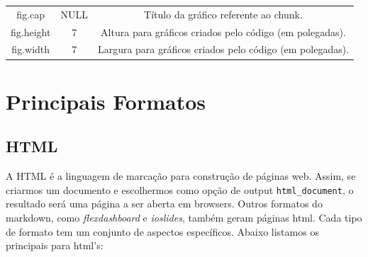 \documentclass[]{book}
\begin{document}
\begin{longtable}[]{@{}ccc@{}}
\begin{minipage}[t]{0.15\columnwidth}
fig.cap\strut
\end{minipage} & \begin{minipage}[t]{0.21\columnwidth}\centering\strut
NULL\strut
\end{minipage} & \begin{minipage}[t]{0.55\columnwidth}\centering\strut
Título da gráfico referente ao chunk.\strut
\end{minipage}\tabularnewline
\begin{minipage}[t]{0.15\columnwidth}\centering\strut
fig.height\strut
\end{minipage} & \begin{minipage}[t]{0.21\columnwidth}\centering\strut
7\strut
\end{minipage} & \begin{minipage}[t]{0.55\columnwidth}\centering\strut
Altura para gráficos criados pelo código (em polegadas).\strut
\end{minipage}\tabularnewline
\begin{minipage}[t]{0.15\columnwidth}\centering\strut
fig.width\strut
\end{minipage} & \begin{minipage}[t]{0.21\columnwidth}\centering\strut
7\strut
\end{minipage} & \begin{minipage}[t]{0.55\columnwidth}\centering\strut
Largura para gráficos criados pelo código (em polegadas).\strut
\end{minipage}\tabularnewline
\bottomrule
\end{longtable}

\section{Principais Formatos}\label{principais-formatos}

\subsection{HTML}\label{html}

A HTML é a linguagem de marcação para construção de páginas web. Assim,
se criarmos um documento e escolhermos como opção de output
\texttt{html\_document}, o resultado será uma página a ser aberta em
browsers. Outros formatos do markdown, como \emph{flexdashboard} e
\emph{ioslides}, também geram páginas html. Cada tipo de formato tem um
conjunto de aspectos específicos. Abaixo listamos os principais para
html's:
\end{document}
